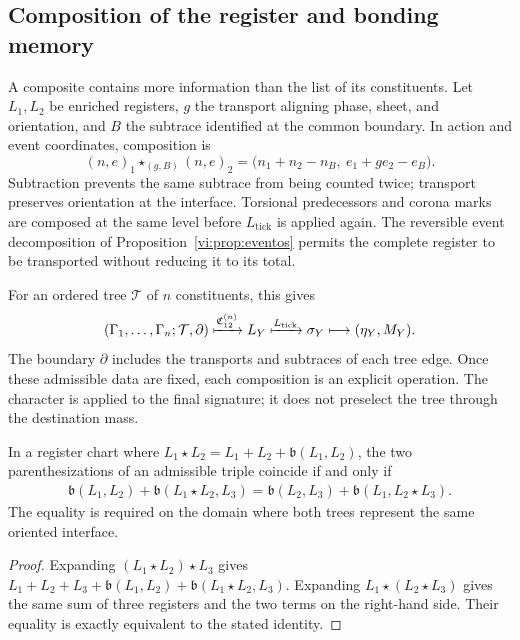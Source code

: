 \subsection{Composition of the register and bonding memory}
\label{vi:subsec:composicion-registro}

A composite contains more information than the list of its
constituents. Let \(L_1,L_2\) be enriched registers, \(g\) the
transport aligning phase, sheet, and orientation, and \(B\) the subtrace
identified at the common boundary. In action and
event coordinates, composition is
\begin{equation}
 (n,e)_1\star_{(g,B)}(n,e)_2
 =\bigl(n_1+n_2-n_B,\ e_1+ge_2-e_B\bigr).
 \label{vi:eq:composicion-frontera}
\end{equation}
Subtraction prevents the same subtrace from being counted twice; transport
preserves orientation at the interface. Torsional predecessors and
corona marks are composed at the same level before
\(L_{\mathrm{tick}}\) is applied again. The reversible event decomposition
of Proposition~\ref{vi:prop:eventos} permits the complete register
to be transported without reducing it to its total.

For an ordered tree \(\mathcal T\) of \(n\) constituents, this gives
\begin{equation}
 (\Gamma_1,\ldots,\Gamma_n;\mathcal T,\partial)
 \xmapsto{\mathfrak C_{12}^{(n)}}L_Y
 \xmapsto{L_{\mathrm{tick}}}\sigma_Y
 \longmapsto (\eta_Y,M_Y).
 \label{vi:eq:cadena-compuesto}
\end{equation}
The boundary \(\partial\) includes the transports and subtraces of each
tree edge. Once these admissible data are fixed, each composition
is an explicit operation. The character is applied to the final signature;
it does not preselect the tree through the destination mass.

\begin{proposition}
\label{vi:prop:cociclo-compuesto}
In a register chart where
\(L_1\star L_2=L_1+L_2+\mathfrak b(L_1,L_2)\), the two
parenthesizations of an admissible triple coincide if and only if
\begin{align*}
 \mathfrak b(L_1,L_2)+\mathfrak b(L_1\star L_2,L_3)
 =\mathfrak b(L_2,L_3)+\mathfrak b(L_1,L_2\star L_3).
\end{align*}
The equality is required on the domain where both trees represent the
same oriented interface.
\end{proposition}
\begin{proof}
Expanding \((L_1\star L_2)\star L_3\) gives
\(L_1+L_2+L_3+\mathfrak b(L_1,L_2)+\mathfrak b(L_1\star L_2,L_3)\).
Expanding \(L_1\star(L_2\star L_3)\) gives the same sum of three
registers and the two terms on the right-hand side. Their equality is
exactly equivalent to the stated identity.
\end{proof}

